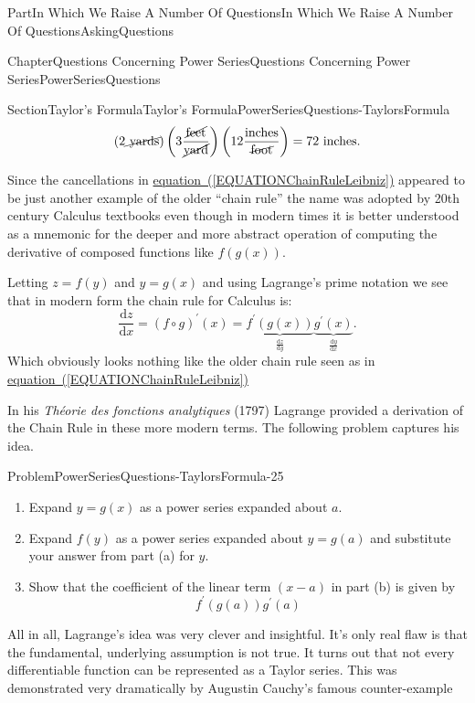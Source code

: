 \documentclass[oneside,10pt,]{book}
\newcommand{\xreffont}{\relax}
\numberwithin{equation}{part}
\newcommand{\dfdx}[2]{\frac{\text{d}{#1}}{\text{d}{#2}}}
\begin{document}
\begin{partptx}{Part}{In Which We Raise A Number Of Questions}{}{In Which We Raise A Number Of Questions}{}{}{AskingQuestions}
\begin{chapterptx}{Chapter}{Questions Concerning Power Series}{}{Questions Concerning Power Series}{}{}{PowerSeriesQuestions}
\begin{sectionptx}{Section}{Taylor's Formula}{}{Taylor's Formula}{}{}{PowerSeriesQuestions-TaylorsFormula}
\begin{equation*}
\left(2\cancel{\text{ yards}}\right)\left(3\frac{\cancel{\text{feet}}}{\cancel{\text{yard}}}\right)\left(12\frac{\text{inches}}{\cancel{\text{foot}}}\right)=72\text{ inches}\text{.}
\end{equation*}
%
\par
Since the cancellations in \hyperref[EQUATIONChainRuleLeibniz]{equation~({\xreffont\ref{EQUATIONChainRuleLeibniz}})} appeared to be just another example of the older ``chain rule'' the name was adopted by 20th century Calculus textbooks even though in modern times it is better understood as a mnemonic for the deeper and more abstract operation of computing the derivative of composed functions like \(f(g(x))\).%
\par
Letting \(z=f(y)\) and \(y=g(x)\) and using Lagrange's prime notation we see that in modern form the chain rule for Calculus is:%
\begin{equation*}
\dfdx{z}{x}=\left(f\circ
g\right)^\prime\left(x\right)=\underbrace{f^\prime\left(g\left(x\right)\right)}_{\dfdx{z}{y}}\underbrace{g^\prime(x)}_{\dfdx{y}{x}{}}\text{.}
\end{equation*}
Which obviously looks nothing like the older chain rule seen as in \hyperref[EQUATIONChainRuleLeibniz]{equation~({\xreffont\ref{EQUATIONChainRuleLeibniz}})}%
\par
In his \textit{Théorie des  fonctions analytiques} (1797) Lagrange  provided a derivation of the Chain Rule in these more modern terms.   The following problem captures his idea.%
\begin{problem}{Problem}{}{PowerSeriesQuestions-TaylorsFormula-25}%
%
\begin{enumerate}[font=\bfseries,label=(\alph*),ref=\alph*]%
\item{}Expand \(y=g(x)\) as a power series expanded about \(a\).%
\item{}Expand \(f(y)\) as a power series expanded about \(y=g(a)\) and substitute your answer from part (a) for \(y\).%
\item{}Show that the coefficient of the linear term \((x-a)\) in part (b) is given by%
\begin{equation*}
f^\prime\left(g\left(a\right)\right)g^\prime(a)
\end{equation*}
%
\end{enumerate}%
\end{problem}
All in all, Lagrange's idea was very clever and insightful. It's only real flaw is that the fundamental, underlying assumption is not true.  It turns out that not every differentiable function can be represented as a Taylor series. This was demonstrated very dramatically by Augustin Cauchy's famous counter-example%

\end{sectionptx}
\end{chapterptx}
\end{partptx}
\end{document}
